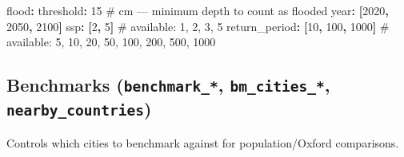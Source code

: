 \documentclass[
  letterpaper,
  DIV=11,
  numbers=noendperiod]{scrreprt}
\newenvironment{Shaded}{\begin{snugshade}}{\end{snugshade}}
\newcommand{\AttributeTok}[1]{\textcolor[rgb]{0.40,0.45,0.13}{#1}}
\newcommand{\CommentTok}[1]{\textcolor[rgb]{0.37,0.37,0.37}{#1}}
\newcommand{\DecValTok}[1]{\textcolor[rgb]{0.68,0.00,0.00}{#1}}
\newcommand{\FunctionTok}[1]{\textcolor[rgb]{0.28,0.35,0.67}{#1}}
\newcommand{\KeywordTok}[1]{\textcolor[rgb]{0.00,0.23,0.31}{\textbf{#1}}}
\begin{document}
\begin{Shaded}
\begin{Highlighting}[]
\FunctionTok{flood}\KeywordTok{:}
\AttributeTok{  }\FunctionTok{threshold}\KeywordTok{:}\AttributeTok{ }\DecValTok{15}\CommentTok{           \# cm — minimum depth to count as flooded}
\AttributeTok{  }\FunctionTok{year}\KeywordTok{:}\AttributeTok{ }\KeywordTok{[}\DecValTok{2020}\KeywordTok{,}\AttributeTok{ }\DecValTok{2050}\KeywordTok{,}\AttributeTok{ }\DecValTok{2100}\KeywordTok{]}
\AttributeTok{  }\FunctionTok{ssp}\KeywordTok{:}\AttributeTok{ }\KeywordTok{[}\DecValTok{2}\KeywordTok{,}\AttributeTok{ }\DecValTok{5}\KeywordTok{]}\CommentTok{             \# available: 1, 2, 3, 5}
\AttributeTok{  }\FunctionTok{return\_period}\KeywordTok{:}\AttributeTok{ }\KeywordTok{[}\DecValTok{10}\KeywordTok{,}\AttributeTok{ }\DecValTok{100}\KeywordTok{,}\AttributeTok{ }\DecValTok{1000}\KeywordTok{]}\CommentTok{   \# available: 5, 10, 20, 50, 100, 200, 500, 1000}
\end{Highlighting}
\end{Shaded}

\subsection{\texorpdfstring{Benchmarks (\texttt{benchmark\_*},
\texttt{bm\_cities\_*},
\texttt{nearby\_countries})}{Benchmarks (benchmark\_*, bm\_cities\_*, nearby\_countries)}}\label{benchmarks-benchmark_-bm_cities_-nearby_countries}

Controls which cities to benchmark against for population/Oxford
comparisons.
\end{document}
